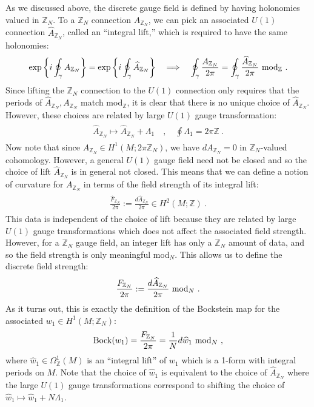 \documentclass[11pt]{article}
\newcommand{\eq}[1]{\begin{align}\begin{split}#1\end{split}\end{align}}
\def\IZ{{\mathbb{Z}}}
\def\IZN{{\mathbb{Z}_N}}
\begin{document}
As we discussed above, the discrete gauge field is defined by having holonomies valued in $\IZ_N$. To a $\IZ_N$ connection $A_{\IZ_N}$, we can pick an associated $U(1)$ connection $\widehat{A}_{\IZ_N}$, called an ``integral lift,'' which is required to have the same holonomies:
\eq{
{\rm exp}\left\{i \oint_\gamma A_{\IZ_N}\right\}={\rm exp}\left\{i\oint_\gamma\widehat{A}_{\IZ_N}\right\}\quad \Longrightarrow \quad \oint_\gamma \frac{A_{\IZ_N}}{2\pi}=\oint_\gamma\frac{\widehat{A}_{\IZ_N}}{2\pi}~{\rm mod}_\IZ~. 
}
Since lifting the $\IZ_N$ connection to the $U(1)$ connection only requires that the periods of  $\widehat{A}_{\IZ_N},A_{\IZ_N}$ match mod$_\IZ$, it is clear that there is no unique choice of $\widehat{A}_{\IZ_N}$. However, these choices are related by large $U(1)$ gauge transformation:
\eq{\widehat{A}_{\IZ_N} \longmapsto \widehat{A}_{\IZ_N} + \Lambda_1\quad, \quad  \oint \Lambda_1 = 2\pi \IZ~.
}
Now note that since $A_{\IZ_N}\in H^1(M;2\pi\IZ_N)$, we have $dA_{\IZ_N}=0$ in $\IZ_N$-valued cohomology. However, a general $U(1)$ gauge field need not be closed and so the choice of lift $\widehat{A}_{\IZ_N}$ is in general not closed. This means that we can define a notion of curvature for $A_{\IZ_N}$ in terms of the field strength of its integral lift:
\eq{
\frac{\widehat{F}_{\IZ_N}}{2\pi}:=\frac{d\widehat{A}_{\IZ_N}}{2\pi}\in H^2(M;\IZ)~.
}
This data is independent of the choice of lift because they are related by large $U(1)$ gauge transformations which does not affect the associated field strength. However, for a $\IZ_N$ gauge field, an integer lift has only a $\IZ_N$ amount of data, and so the field strength is only meaningful mod$_N$. This allows us to define the discrete field strength:
\eq{
\frac{F_{\IZ_N}}{2\pi}:=\frac{d\widehat{A}_{\IZ_N}}{2\pi}~{\rm mod}_N~. 
}
As it turns out, this is exactly the definition of the Bockstein map for the associated $w_1\in H^1(M;\IZ_N)$:
\eq{
{\rm Bock}(w_1)=\frac{F_{\IZ_N}}{2\pi}=\frac{1}{N}d\widehat{w}_1~{\rm mod}_N~,
}
where $\widehat{w}_1\in \Omega^1_\IZ(M)$ is an ``integral lift'' of $w_1$ which is a 1-form with integral periods on $M$. Note that the choice of $\widehat{w}_1$ is equivalent to the choice of $\widehat{A}_\IZN$ where the large $U(1)$ gauge transformations correspond to shifting the choice of $\widehat{w}_1\longmapsto \widehat{w}_1+N\Lambda_1$. 
\end{document}
